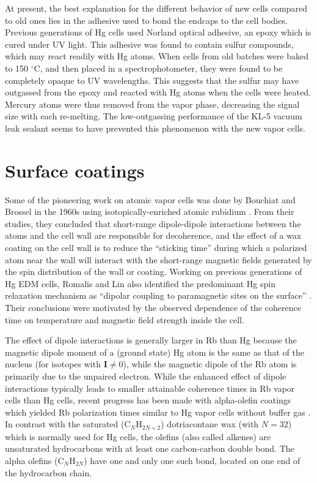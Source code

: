 \documentclass [10pt, twoside] {uwthesis}[2012/04/02]
\begin{document}
At present, the best explanation for the different behavior of new cells compared to old ones lies in the adhesive used to bond the endcaps to the cell bodies. Previous generations of Hg cells used Norland optical adhesive, an epoxy which is cured under UV light. This adhesive was found to contain sulfur compounds, which may react readily with Hg atoms. When cells from old batches were baked to 150 $^{\circ}$C, and then placed in a spectrophotometer, they were found to be completely opaque to UV wavelengths. This suggests that the sulfur may have outgassed from the epoxy and reacted with Hg atoms when the cells were heated. Mercury atoms were thus removed from the vapor phase, decreasing the signal size with each re-melting. The low-outgassing performance of the KL-5 vacuum leak sealant seems to have prevented this phenomenon with the new vapor cells.

\section{Surface coatings}
Some of the pioneering work on atomic vapor cells was done by Bouchiat and Brossel in the 1960s using isotopically-enriched atomic rubidium \cite{1966_Bouchiat_Brossel_Rb_relaxation}. From their studies, they concluded that short-range dipole-dipole interactions between the atoms and the cell wall are responsible for decoherence, and the effect of a wax coating on the cell wall is to reduce the ``sticking time'' during which a polarized atom near the wall will interact with the short-range magnetic fields generated by the spin distribution of the wall or coating. Working on previous generations of Hg EDM cells, Romalis and Lin also identified the predominant Hg spin relaxation mechanism as ``dipolar coupling to paramagnetic sites on the surface'' \cite{2004_Romalis_Lin_Hg_relaxation}. Their conclusions were motivated by the observed dependence of the coherence time on temperature and magnetic field strength inside the cell.

The effect of dipole interactions is generally larger in Rb than Hg because the magnetic dipole moment of a (ground state) Hg atom is the same as that of the nucleus (for isotopes with $\mathbf{I} \neq 0$), while the magnetic dipole of the Rb atom is primarily due to the unpaired electron. While the enhanced effect of dipole interactions typically leads to smaller attainable coherence times in Rb vapor cells than Hg cells, recent progress has been made with alpha-olefin coatings \cite{2010_Budker_long_Rb_coherence_alpha_olefins} which yielded Rb polarization times similar to Hg vapor cells without buffer gas \cite{2013_PSI_Hg_antirelaxation_coatings}. In contrast with the saturated (C$_{N}$H$_{2N+2}$) dotriacontane wax (with $N=32$) which is normally used for Hg cells, the olefins (also called alkenes) are unsaturated hydrocarbons with at least one carbon-carbon double bond. The alpha olefins (C$_{N}$H$_{2N}$) have one and only one such bond, located on one end of the hydrocarbon chain. 
\end{document}
